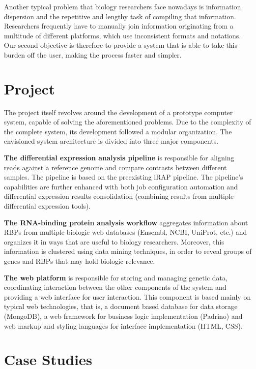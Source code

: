 \documentclass[9pt,a4paper]{extarticle}
\begin{document}
\begin{multicols}{2}
Another typical problem that biology researchers face nowadays is information
dispersion and the repetitive and lengthy task of compiling that information.
Researchers frequently have to manually join information originating from a
multitude of different platforms, which use inconsistent formats and notations.
Our second objective is therefore to provide a system that is able to take this
burden off the user, making the process faster and simpler.

\section{Project} \label{sec:project}

The project itself revolves around the development of a prototype computer
system, capable of solving the aforementioned problems. Due to the complexity
of the complete system, its development followed a modular organization. The
envisioned system architecture is divided into three major components.

  \textbf{The differential expression analysis pipeline}
  is responsible for aligning reads against a reference genome and compare
  contrasts between different samples. The pipeline is based on the preexisting
  iRAP pipeline. The pipeline's capabilities are further enhanced with both job
  configuration automation and differential expression results consolidation
  (combining results from multiple differential expression tools).

  \textbf{The RNA-binding protein analysis workflow}
  aggregates information about RBPs from multiple biologic web databases
  (Ensembl, NCBI, UniProt, etc.) and organizes it in ways that are useful to
  biology researchers. Moreover, this information is clustered using data mining
  techniques, in order to reveal groups of genes and RBPs that may hold biologic
  relevance.

  \textbf{The web platform}
  is responsible for storing and managing genetic data, coordinating interaction
  between the other components of the system and providing a web interface for
  user interaction. This component is based mainly on typical web technologies,
  that is, a document based database for data storage (MongoDB), a web framework
  for business logic implementation (Padrino) and web markup and styling
  languages for interface implementation (HTML, CSS).

\section{Case Studies}


\end{multicols}
\end{document}
